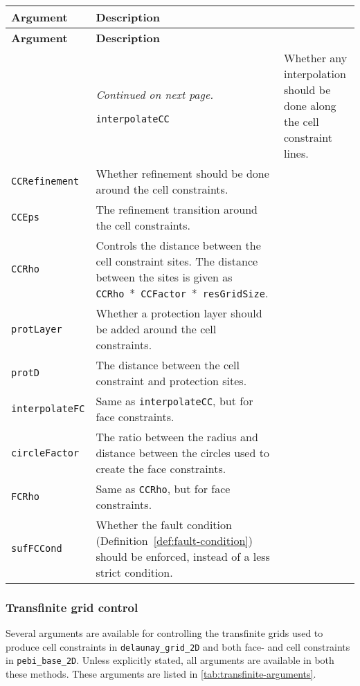 \begin{tabularx}{\textwidth}{l X}
    \caption{Constraint creation arguments in \texttt{pebiGrid2DGmsh}.}
    \label{tab:constraint-arguments} \\
    \toprule \textbf{Argument} & \textbf{Description} \\\midrule \endfirsthead
    \textbf{Argument} & \textbf{Description} \\\midrule \endhead
    \bottomrule & \textit{Continued on next page.} \endfoot
    \bottomrule \endlastfoot
    
    \texttt{interpolateCC} & Whether any interpolation should be done along the cell constraint lines. \\
    \texttt{CCRefinement} & Whether refinement should be done around the cell constraints. \\
    \texttt{CCEps} & The refinement transition around the cell constraints. \\
    \texttt{CCRho} & Controls the distance between the cell constraint sites. The distance between the sites is given as \texttt{CCRho}~*~\texttt{CCFactor}~*~\texttt{resGridSize}. \\
    \texttt{protLayer} & Whether a protection layer should be added around the cell constraints. \\
    \texttt{protD} & The distance between the cell constraint and protection sites. \\
    \texttt{interpolateFC} & Same as \texttt{interpolateCC}, but for face constraints. \\
    \texttt{circleFactor} & The ratio between the radius and distance between the circles used to create the face constraints. \\
    \texttt{FCRho} & Same as \texttt{CCRho}, but for face constraints. \\
    \texttt{sufFCCond} & Whether the fault condition (Definition~\ref{def:fault-condition}) should be enforced, instead of a less strict condition. \\
\end{tabularx}



\subsubsection{Transfinite grid control}
Several arguments are available for controlling the transfinite grids used to produce cell constraints in \verb|delaunay_grid_2D| and both face- and cell constraints in \verb|pebi_base_2D|. Unless explicitly stated, all arguments are available in both these methods. These arguments are listed in \autoref{tab:transfinite-arguments}.

